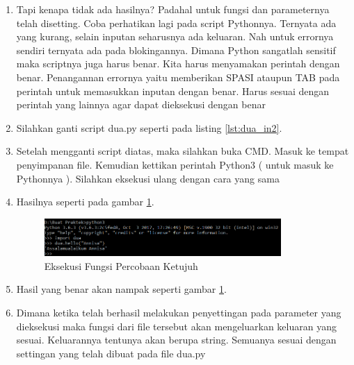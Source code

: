\begin{enumerate}
\item Tapi kenapa tidak ada hasilnya? Padahal untuk fungsi dan parameternya telah disetting. Coba perhatikan lagi pada script Pythonnya. Ternyata ada yang kurang, selain inputan seharusnya ada keluaran. Nah untuk errornya sendiri ternyata ada pada blokingannya. Dimana Python sangatlah sensitif maka scriptnya juga harus benar. Kita harus menyamakan perintah dengan benar. Penangannan errornya yaitu memberikan SPASI ataupun TAB pada perintah untuk memasukkan inputan dengan benar. Harus sesuai dengan perintah yang lainnya agar dapat dieksekusi dengan benar
\item Silahkan ganti script dua.py seperti pada listing \ref{lst:dua_in2}.

\item Setelah mengganti script diatas, maka silahkan buka CMD. Masuk ke tempat penyimpanan file. Kemudian kettikan perintah Python3 ( untuk masuk ke Pythonnya ). Silahkan eksekusi ulang dengan cara yang sama
\item Hasilnya seperti pada gambar \ref{fig:eksekusi_fungsi7}.
\begin{figure}[!htbp]
	\centerline{\includegraphics[width=0.85\textwidth]{figures/8/eksekusi_fungsi7.png}}
	\caption{Eksekusi Fungsi Percobaan Ketujuh}
	\label{fig:eksekusi_fungsi7}
\end{figure}
\item Hasil yang benar akan nampak seperti gambar \ref{fig:eksekusi_fungsi7}.
\item Dimana ketika telah berhasil melakukan penyettingan pada parameter yang dieksekusi maka fungsi dari file tersebut akan mengeluarkan keluaran yang sesuai. Keluarannya tentunya akan berupa string. Semuanya sesuai dengan settingan yang telah dibuat pada file dua.py
\end{enumerate}


